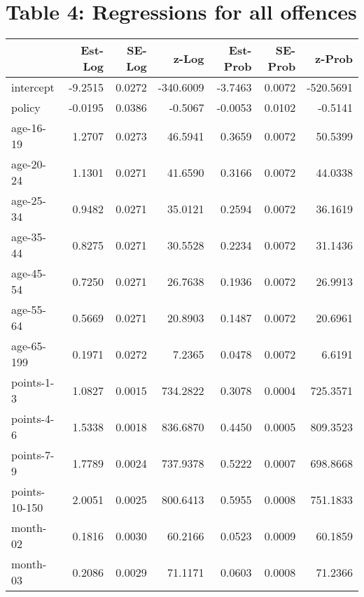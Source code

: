 \documentclass[10pt]{article}
\begin{document}
\clearpage
\pagebreak




\section{Table 4: Regressions for all offences}




\begin{table}[ht]
\centering
\begin{tabular}{lrrrrrr}
  \hline
 & Est-Log & SE-Log & z-Log & Est-Prob & SE-Prob & z-Prob \\ 
  \hline
intercept & -9.2515 & 0.0272 & -340.6009 & -3.7463 & 0.0072 & -520.5691 \\ 
  policy & -0.0195 & 0.0386 & -0.5067 & -0.0053 & 0.0102 & -0.5141 \\ 
  age-16-19 & 1.2707 & 0.0273 & 46.5941 & 0.3659 & 0.0072 & 50.5399 \\ 
  age-20-24 & 1.1301 & 0.0271 & 41.6590 & 0.3166 & 0.0072 & 44.0338 \\ 
  age-25-34 & 0.9482 & 0.0271 & 35.0121 & 0.2594 & 0.0072 & 36.1619 \\ 
  age-35-44 & 0.8275 & 0.0271 & 30.5528 & 0.2234 & 0.0072 & 31.1436 \\ 
  age-45-54 & 0.7250 & 0.0271 & 26.7638 & 0.1936 & 0.0072 & 26.9913 \\ 
  age-55-64 & 0.5669 & 0.0271 & 20.8903 & 0.1487 & 0.0072 & 20.6961 \\ 
  age-65-199 & 0.1971 & 0.0272 & 7.2365 & 0.0478 & 0.0072 & 6.6191 \\ 
  points-1-3 & 1.0827 & 0.0015 & 734.2822 & 0.3078 & 0.0004 & 725.3571 \\ 
  points-4-6 & 1.5338 & 0.0018 & 836.6870 & 0.4450 & 0.0005 & 809.3523 \\ 
  points-7-9 & 1.7789 & 0.0024 & 737.9378 & 0.5222 & 0.0007 & 698.8668 \\ 
  points-10-150 & 2.0051 & 0.0025 & 800.6413 & 0.5955 & 0.0008 & 751.1833 \\ 
  month-02 & 0.1816 & 0.0030 & 60.2166 & 0.0523 & 0.0009 & 60.1859 \\ 
  month-03 & 0.2086 & 0.0029 & 71.1171 & 0.0603 & 0.0008 & 71.2366 \\ 

\end{tabular}
\end{table}
\end{document}
